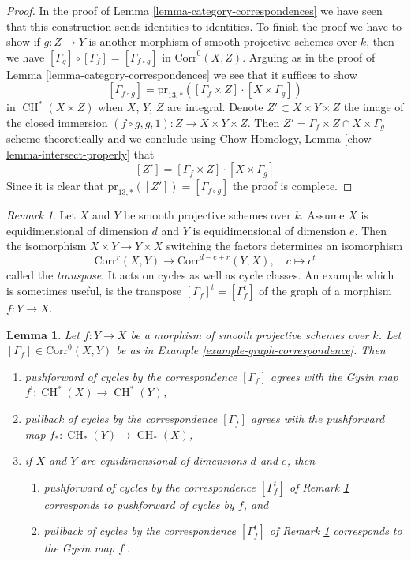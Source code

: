 \documentclass{stacks-project}
\theoremstyle{plain}
\newtheorem{lemma}[subsection]{Lemma}
\theoremstyle{definition}
\theoremstyle{remark}
\newtheorem{remark}[subsection]{Remark}
\numberwithin{equation}{subsection}
\def\CH{\mathop{\mathrm{CH}}\nolimits}
\begin{document}
\begin{proof}
In the proof of Lemma \ref{lemma-category-correspondences}
we have seen that this construction sends identities to
identities. To finish the proof we have to show if $g : Z \to Y$
is another morphism of smooth projective schemes over $k$, then we have
$[\Gamma_g] \circ [\Gamma_f] = [\Gamma_{f \circ g}]$ in
$\text{Corr}^0(X, Z)$. Arguing as in the proof of
Lemma \ref{lemma-category-correspondences} we see that it
suffices to show
$$
[\Gamma_{f \circ g}] =
\text{pr}_{13, *}([\Gamma_f \times Z] \cdot [X \times \Gamma_g])
$$
in $\CH^*(X \times Z)$ when $X$, $Y$, $Z$ are integral.
Denote $Z' \subset X \times Y \times Z$ the image of the closed immersion
$(f \circ g, g, 1) : Z \to X \times Y \times Z$.
Then $Z' = \Gamma_f \times Z \cap X \times \Gamma_g$
scheme theoretically and we conclude using
Chow Homology, Lemma \ref{chow-lemma-intersect-properly}
that
$$
[Z'] = [\Gamma_f \times Z] \cdot [X \times \Gamma_g]
$$
Since it is clear that $\text{pr}_{13, *}([Z']) = [\Gamma_{f \circ g}]$
the proof is complete.
\end{proof}

\begin{remark}
\label{remark-transpose}
Let $X$ and $Y$ be smooth projective schemes over $k$.
Assume $X$ is equidimensional of dimension $d$ and
$Y$ is equidimensional of dimension $e$. Then the isomorphism
$X \times Y \to Y \times X$ switching the factors determines
an isomorphism
$$
\text{Corr}^r(X, Y) \longrightarrow \text{Corr}^{d - e + r}(Y, X),\quad
c \longmapsto c^t
$$
called the {\it transpose}. It acts on cycles as well as cycle classes.
An example which is sometimes useful, is the transpose
$[\Gamma_f]^t = [\Gamma_f^t]$ of the graph of a morphism $f : Y \to X$.
\end{remark}

\begin{lemma}
\label{lemma-functor-and-cycles}
Let $f : Y \to X$ be a morphism of smooth projective schemes over $k$.
Let $[\Gamma_f] \in \text{Corr}^0(X, Y)$ be as in
Example \ref{example-graph-correspondence}. Then
\begin{enumerate}
\item pushforward of cycles by the correspondence $[\Gamma_f]$
agrees with the Gysin map $f^! : \CH^*(X) \to \CH^*(Y)$,
\item pullback of cycles by the correspondence $[\Gamma_f]$
agrees with the pushforward map $f_* : \CH_*(Y) \to \CH_*(X)$,
\item if $X$ and $Y$ are equidimensional of dimensions $d$ and $e$,
then
\begin{enumerate}
\item pushforward of cycles by the correspondence
$[\Gamma_f^t]$ of Remark \ref{remark-transpose}
corresponds to pushforward of cycles by $f$, and
\item pullback of cycles by the correspondence
$[\Gamma_f^t]$ of Remark \ref{remark-transpose}
corresponds to the Gysin map $f^!$.
\end{enumerate}
\end{enumerate}
\end{lemma}
\end{document}

